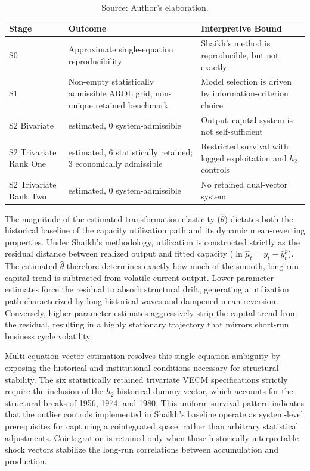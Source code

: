 \documentclass[11pt]{article}
\begin{document}
\begin{table}[H]
\centering
\caption{Cross-Stage Synthesis of the Cointegration Architecture}
\label{tab:cross_stage_synthesis}
\small
\begin{tabular}{@{}>{\raggedright\arraybackslash}p{3.2cm}>{\raggedright\arraybackslash}p{4.6cm}>{\raggedright\arraybackslash}p{5.6cm}@{}}
\toprule
Stage & Outcome & Interpretive Bound \\
\midrule
\midrule
S0 & Approximate single-equation reproducibility & Shaikh's method is reproducible, but not exactly \\
S1 & Non-empty statistically admissible ARDL grid; non-unique retained benchmark & Model selection is driven by information-criterion choice \\
S2 Bivariate & 36 estimated, 0 system-admissible & Output--capital system is not self-sufficient \\
S2 Trivariate Rank One & 36 estimated, 6 statistically retained; 3 economically admissible & Restricted survival with logged exploitation and $h_2$ controls \\
S2 Trivariate Rank Two & 36 estimated, 0 system-admissible & No retained dual-vector system \\
\bottomrule
\end{tabular}
\caption*{Source: Author's elaboration.}
\end{table}

The magnitude of the estimated transformation elasticity ($\hat{\theta}$) dictates both the historical baseline of the capacity utilization path and its dynamic mean-reverting properties. Under Shaikh's methodology, utilization is constructed strictly as the residual distance between realized output and fitted capacity ($\ln \hat{\mu}_t = y_t - \hat{y}^p_t$). The estimated $\hat{\theta}$ therefore determines exactly how much of the smooth, long-run capital trend is subtracted from volatile current output. Lower parameter estimates force the residual to absorb structural drift, generating a utilization path characterized by long historical waves and dampened mean reversion. Conversely, higher parameter estimates aggressively strip the capital trend from the residual, resulting in a highly stationary trajectory that mirrors short-run business cycle volatility. 

Multi-equation vector estimation resolves this single-equation ambiguity by exposing the historical and institutional conditions necessary for structural stability. The six statistically retained trivariate VECM specifications strictly require the inclusion of the $h_2$ historical dummy vector, which accounts for the structural breaks of 1956, 1974, and 1980. This uniform survival pattern indicates that the outlier controls implemented in Shaikh's baseline operate as system-level prerequisites for capturing a cointegrated space, rather than arbitrary statistical adjustments. Cointegration is retained only when these historically interpretable shock vectors stabilize the long-run correlations between accumulation and production.
\end{document}

